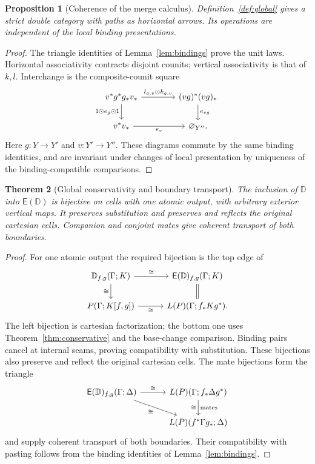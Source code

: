 \documentclass[11pt,a4paper]{article}
\newtheorem{theorem}{Theorem}[section]
\newtheorem{proposition}[theorem]{Proposition}
\theoremstyle{definition}
\theoremstyle{remark}
\numberwithin{equation}{section}
\newcommand{\D}{\mathbb D}
\newcommand{\Ecal}{\mathsf E}
\newcommand{\wh}{\mathbin{\odot}}
\newcommand{\emp}[1]{\varnothing_{#1}}
\begin{document}
\begin{proposition}[Coherence of the merge calculus]\label{prop:merge}
Definition~\ref{def:global} gives a strict double category with paths as
horizontal arrows. Its operations are independent of the local binding
presentations.
\end{proposition}
\begin{proof}
The triangle identities of Lemma~\ref{lem:bindings} prove the unit laws. Horizontal
associativity contracts disjoint counits; vertical associativity is that
of $k,l$. Interchange is the composite-counit square
\[
\begin{tikzcd}[column sep=4em]
v^*g^*g_*v_* \arrow[r,"l_{g,v}\wh k_{g,v}"]
  \arrow[d,"1\wh e_g\wh1"'] &
(vg)^*(vg)_* \arrow[d,"e_{vg}"]\\
v^*v_* \arrow[r,"e_v"'] & \emp{Y''}.
\end{tikzcd}
\]
Here $g:Y\to Y'$ and $v:Y'\to Y''$.
These diagrams commute by the same binding identities, and are
invariant under changes of local presentation by uniqueness of the
binding-compatible comparisons.
\end{proof}

\begin{theorem}[Global conservativity and boundary transport]\label{thm:global}
The inclusion of $\D$ into $\Ecal(\D)$ is bijective on cells with one
atomic output, with arbitrary exterior vertical maps. It preserves
substitution and preserves and reflects the original cartesian cells.
Companion and conjoint mates give coherent transport of both boundaries.
\end{theorem}
\begin{proof}
For one atomic output the required bijection is the top edge of
\begin{equation}\label{eq:globalconservative}
\begin{tikzcd}[column sep=3em]
\D_{f,g}(\Gamma;K)
  \arrow[r,"\cong"] \arrow[d,"\cong"'] &
\Ecal(\D)_{f,g}(\Gamma;K) \arrow[d,equal]\\
P(\Gamma;K[f,g]) \arrow[r,"\cong"'] &
L(P)(\Gamma;f_*Kg^*).
\end{tikzcd}
\end{equation}
The left bijection is cartesian factorization; the bottom one uses
Theorem~\ref{thm:conservative} and the base-change comparison. Binding
pairs cancel at internal seams, proving compatibility with substitution.
These bijections also preserve and reflect the original cartesian cells.
The mate bijections form the triangle
\[
\begin{tikzcd}[column sep=3em]
\Ecal(\D)_{f,g}(\Gamma;\Delta)
  \arrow[r,"\cong"] \arrow[dr,"\cong"'] &
L(P)(\Gamma;f_*\Delta g^*) \arrow[d,"\text{mates}","\cong"']\\
& L(P)(f^*\Gamma g_*;\Delta)
\end{tikzcd}
\]
and supply coherent transport of both boundaries. Their compatibility
with pasting follows from the binding identities of
Lemma~\ref{lem:bindings}.
\end{proof}
\end{document}
